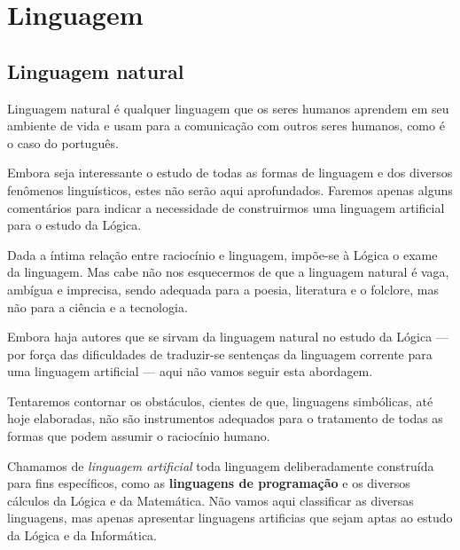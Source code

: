 \documentclass[
	14pt,				%
	twoside,			%
	a4paper,			%
	english,			%
	french,				%
	spanish,			%
	brazil,				%
    ]{abntex2}
\begin{document}
\pagestyle{plain}

\chapter{Linguagem}
\section{Linguagem natural}

\thispagestyle{plain}


Linguagem natural é qualquer linguagem que os seres humanos aprendem em seu
ambiente de vida e usam para a comunicação com outros seres humanos, como é o
caso do português.

Embora seja interessante o estudo de todas as formas de linguagem e dos diversos
fenômenos linguísticos, estes não serão aqui aprofundados. Faremos apenas alguns
comentários para indicar a necessidade de construirmos uma linguagem artificial
para o estudo da Lógica.

Dada a íntima relação entre raciocínio e linguagem, impõe-se à Lógica o exame da linguagem.
Mas cabe não nos esquecermos de que a linguagem natural é vaga, ambígua e imprecisa, sendo adequada para a poesia, literatura e o folclore, mas não para a ciência e a tecnologia.

Embora haja autores que se sirvam da linguagem natural no estudo da Lógica --- por força das dificuldades de traduzir-se sentenças da linguagem corrente para uma linguagem artificial --- aqui não vamos seguir esta abordagem.

Tentaremos contornar os obstáculos, cientes de que, linguagens simbólicas, até hoje elaboradas, não são instrumentos adequados para o tratamento de todas as formas que podem assumir o raciocínio humano.

\newpage

Chamamos de \emph{linguagem artificial} %
toda linguagem deliberadamente construída para fins específicos, como as \textbf{linguagens de programação} e os diversos cálculos da Lógica e da Matemática.
Não vamos aqui classificar as diversas linguagens, mas apenas apresentar linguagens artificias que sejam aptas ao estudo da Lógica e da Informática.
\end{document}
